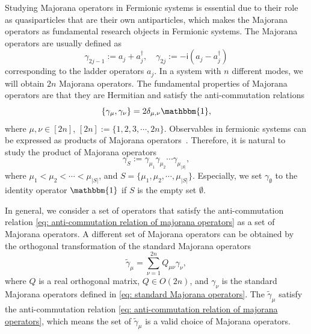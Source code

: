 \documentclass{article}
\newcommand{\ii}{\mathsf{i}}
\begin{document}
Studying Majorana operators in Fermionic systems is essential due to their role as quasiparticles that are their own antiparticles, which makes the Majorana operators as fundamental research objects in Fermionic systems. The Majorana operators are usually defined as 
\begin{equation}
    \gamma_{2 j-1}:=a_j+a_j^{\dagger}, \quad \gamma_{2 j}:=-\ii\left(a_j-a_j^{\dagger}\right)
    \label{eq: standard Majorana operators}
\end{equation}
corresponding to the ladder operators $a_j$. In a system with $n$ different modes, we will obtain $2n$ Majorana operators. The fundamental properties of Majorana operators are that they are Hermitian and satisfy the anti-commutation relations
\begin{equation}
    \{\gamma_\mu, \gamma_\nu\} = 2 \delta_{\mu, \nu} \mathbbm{1},
    \label{eq: anti-commutation relation of majorana operators}
\end{equation}
where $\mu, \nu \in [2n]$, $[2n]:= \{1,2,3,\cdots, 2n\}$. Observables in fermionic systems can be expressed as products of Majorana operators~\cite{hackl2021bosonic}. Therefore, it is natural to study the product of Majorana operators 
\begin{equation}
    \gamma_S := \gamma_{\mu_1}\gamma_{\mu_2}\cdots\gamma_{\mu_{|S|}},
\end{equation}
where $\mu_1 < {\mu_2}< \cdots < \mu_{|S|}$, and $S = \{\mu_1 , {\mu_2}, \cdots , \mu_{|S|}\}$. Especially, we set $\gamma_\emptyset$ to the identity operator $\mathbbm{1}$ if $S$ is the empty set $\emptyset$.


In general, we consider a set of operators that satisfy the anti-commutation relation \eqref{eq: anti-commutation relation of majorana operators} as a set of Majorana operators. A different set of Majorana operators can be obtained by the orthogonal transformation of the standard Majorana operators
\begin{equation}
    \tilde{\gamma}_\mu=\sum_{\nu=1}^{2 n} Q_{\mu \nu} \gamma_\nu,
\end{equation}
where $Q$ is a real orthogonal matrix, $Q \in O(2n)$, and $\gamma_\nu$ is the standard Majorana operators defined in \eqref{eq: standard Majorana operators}.
The $\tilde{\gamma}_\mu$ satisfy the anti-commutation relation \eqref{eq: anti-commutation relation of majorana operators}, which means the set of $\tilde{\gamma}_\mu$ is a valid choice of Majorana operators. 
\end{document}
